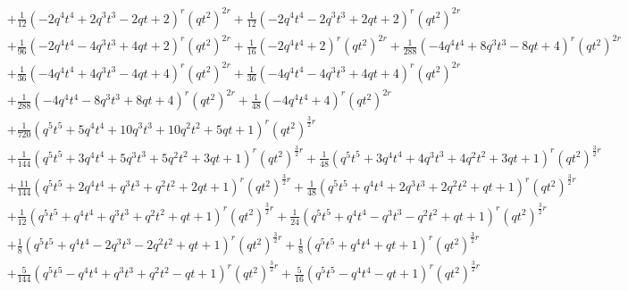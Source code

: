 \documentclass[11pt,english]{amsart}
\numberwithin{equation}{section}
\numberwithin{figure}{section}
\theoremstyle{plain}
\theoremstyle{plain}
\theoremstyle{definition}
\theoremstyle{remark}
\begin{document}
{\begin{align*}
& + \frac{1}{12}  {\left(-2  q^{4} t^{4} + 2  q^{3} t^{3} - 2  q t + 2\right)}^{r} \left(q t^{2}\right)^{2  r} + \frac{1}{12}  {\left(-2  q^{4} t^{4} - 2  q^{3} t^{3} + 2  q t + 2\right)}^{r} \left(q t^{2}\right)^{2  r} \\
& + \frac{1}{96}  {\left(-2  q^{4} t^{4} - 4  q^{3} t^{3} + 4  q t + 2\right)}^{r} \left(q t^{2}\right)^{2  r} + \frac{1}{16}  {\left(-2  q^{4} t^{4} + 2\right)}^{r} \left(q t^{2}\right)^{2  r} + \frac{1}{288}  {\left(-4  q^{4} t^{4} + 8  q^{3} t^{3} - 8  q t + 4\right)}^{r} \left(q t^{2}\right)^{2  r} \\
& + \frac{1}{36}  {\left(-4  q^{4} t^{4} + 4  q^{3} t^{3} - 4  q t + 4\right)}^{r} \left(q t^{2}\right)^{2  r} + \frac{1}{36}  {\left(-4  q^{4} t^{4} - 4  q^{3} t^{3} + 4  q t + 4\right)}^{r} \left(q t^{2}\right)^{2  r} \\
& + \frac{1}{288}  {\left(-4  q^{4} t^{4} - 8  q^{3} t^{3} + 8  q t + 4\right)}^{r} \left(q t^{2}\right)^{2  r} + \frac{1}{48}  {\left(-4  q^{4} t^{4} + 4\right)}^{r} \left(q t^{2}\right)^{2  r} \\
& + \frac{1}{720}  {\left(q^{5} t^{5} + 5  q^{4} t^{4} + 10  q^{3} t^{3} + 10  q^{2} t^{2} + 5  q t + 1\right)}^{r} \left(q t^{2}\right)^{\frac{3}{2}  r} \\
& + \frac{1}{144}  {\left(q^{5} t^{5} + 3  q^{4} t^{4} + 5  q^{3} t^{3} + 5  q^{2} t^{2} + 3  q t + 1\right)}^{r} \left(q t^{2}\right)^{\frac{3}{2}  r} + \frac{1}{48}  {\left(q^{5} t^{5} + 3  q^{4} t^{4} + 4  q^{3} t^{3} + 4  q^{2} t^{2} + 3  q t + 1\right)}^{r} \left(q t^{2}\right)^{\frac{3}{2}  r} \\
& + \frac{11}{144}  {\left(q^{5} t^{5} + 2  q^{4} t^{4} + q^{3} t^{3} + q^{2} t^{2} + 2  q t + 1\right)}^{r} \left(q t^{2}\right)^{\frac{3}{2}  r} + \frac{1}{48}  {\left(q^{5} t^{5} + q^{4} t^{4} + 2  q^{3} t^{3} + 2  q^{2} t^{2} + q t + 1\right)}^{r} \left(q t^{2}\right)^{\frac{3}{2}  r} \\
& + \frac{1}{12}  {\left(q^{5} t^{5} + q^{4} t^{4} + q^{3} t^{3} + q^{2} t^{2} + q t + 1\right)}^{r} \left(q t^{2}\right)^{\frac{3}{2}  r} + \frac{1}{24}  {\left(q^{5} t^{5} + q^{4} t^{4} - q^{3} t^{3} - q^{2} t^{2} + q t + 1\right)}^{r} \left(q t^{2}\right)^{\frac{3}{2}  r} \\
& + \frac{1}{8}  {\left(q^{5} t^{5} + q^{4} t^{4} - 2  q^{3} t^{3} - 2  q^{2} t^{2} + q t + 1\right)}^{r} \left(q t^{2}\right)^{\frac{3}{2}  r} + \frac{1}{8}  {\left(q^{5} t^{5} + q^{4} t^{4} + q t + 1\right)}^{r} \left(q t^{2}\right)^{\frac{3}{2}  r} \\
& + \frac{5}{144}  {\left(q^{5} t^{5} - q^{4} t^{4} + q^{3} t^{3} + q^{2} t^{2} - q t + 1\right)}^{r} \left(q t^{2}\right)^{\frac{3}{2}  r} + \frac{5}{16}  {\left(q^{5} t^{5} - q^{4} t^{4} - q t + 1\right)}^{r} \left(q t^{2}\right)^{\frac{3}{2}  r} \\

\end{align*}}
\end{document}
